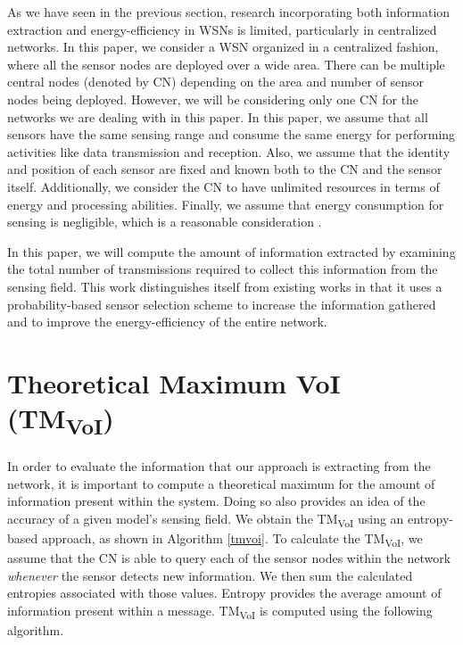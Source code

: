 As we have seen in the previous section, research incorporating both
information extraction and energy-efficiency in WSNs is limited,
particularly in centralized networks. In this paper, we consider a WSN
organized in a centralized fashion, where all the sensor nodes are
deployed over a wide area. There can be multiple central nodes
(denoted by CN) depending on the area and number of sensor nodes being
deployed. However, we will be considering only one CN for the networks
we are dealing with in this paper. In this paper, we assume that all
sensors have the same sensing range and consume the same energy for
performing activities like data transmission and reception. Also, we
assume that the identity and position of each sensor are fixed and
known both to the CN and the sensor itself. Additionally, we consider
the CN to have unlimited resources in terms of energy and processing
abilities. Finally, we assume that energy consumption for sensing is
negligible, which is a reasonable consideration
\cite{hu2006deploying}.

In this paper, we will compute the amount of information extracted by
examining the total number of transmissions required to collect this
information from the sensing field. This work distinguishes itself
from existing works \cite{chou2009energy} in that it uses a
probability-based sensor selection scheme to increase the information
gathered and to improve the energy-efficiency of the entire network.

\section{Theoretical Maximum VoI (TM\textsubscript {VoI})}
In order to evaluate the information that our approach is extracting
from the network, it is important to compute a theoretical maximum for
the amount of information present within the system.  Doing so also
provides an idea of the accuracy of a given model's sensing field. We
obtain the TM\textsubscript {VoI} using an entropy-based approach, as
shown in Algorithm \ref{tmvoi}. To calculate the TM\textsubscript
{VoI}, we assume that the CN is able to query each of the sensor nodes
within the network \emph{whenever} the sensor detects new information.
We then sum the calculated entropies associated with those
values. Entropy provides the average amount of information present
within a message.  TM\textsubscript {VoI} is computed using the
following algorithm.

